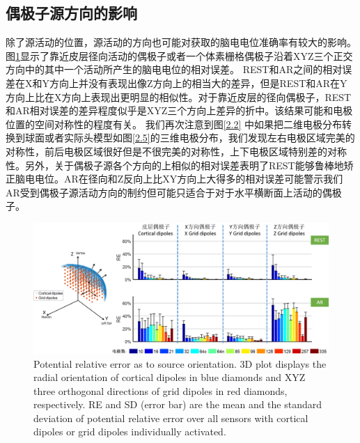 \subsection{偶极子源方向的影响}
除了源活动的位置，源活动的方向也可能对获取的脑电电位准确率有较大的影响。图\ref{2.7}显示了靠近皮层径向活动的偶极子或者一个体素栅格偶极子沿着XYZ三个正交方向中的其中一个活动所产生的脑电电位的相对误差。 REST和AR之间的相对误差在X和Y方向上并没有表现出像Z方向上的相当大的差异，但是REST和AR在Y方向上比在X方向上表现出更明显的相似性。对于靠近皮层的径向偶极子，REST和AR相对误差的差异程度似乎是XYZ三个方向上差异的折中。该结果可能和电极位置的空间对称性的程度有关。 我们再次注意到图\ref{2.2}
中如果把二维电极分布转换到球面或者实际头模型如图\ref{2.5}的三维电极分布，我们发现左右电极区域完美的对称性，前后电极区域很好但是不很完美的对称性，上下电极区域特别差的对称性。另外，关于偶极子源各个方向的上相似的相对误差表明了REST能够鲁棒地矫正脑电电位。AR在径向和Z反向上比XY方向上大得多的相对误差可能警示我们AR受到偶极子源活动方向的制约但可能只适合于对于水平横断面上活动的偶极子。
\begin{figure}[h!]
	\centering
	\includegraphics[width=15cm]{pic/JNE/figure7.png}
	\caption{Potential relative error as to source orientation. 3D plot displays the radial orientation of cortical dipoles in blue diamonds and XYZ three orthogonal directions of grid dipoles in red diamonds, respectively. RE and SD (error bar) are the mean and the standard deviation of potential relative error over all sensors with cortical dipoles or grid dipoles individually activated.}
	\label{2.7}
\end{figure}

